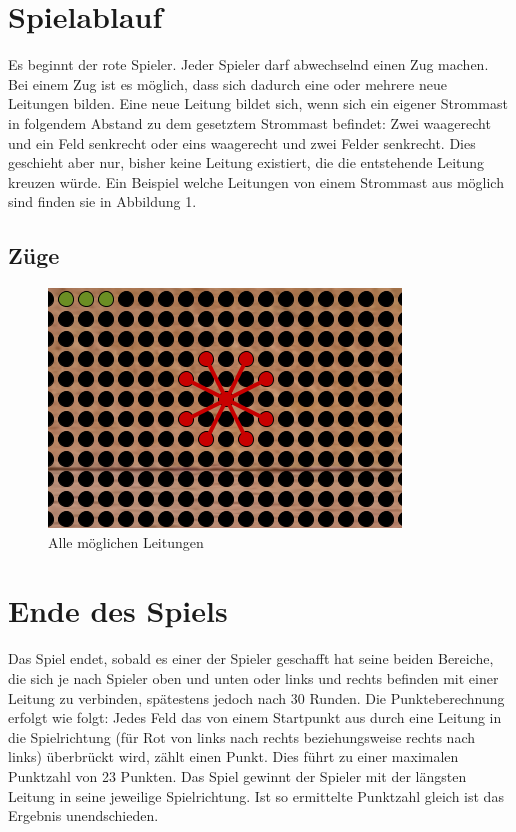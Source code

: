 \documentclass[a4paper, ngerman]{scrartcl}
\begin{document}
\section{Spielablauf}	 

	Es beginnt der rote Spieler. Jeder Spieler darf abwechselnd einen
	Zug machen. Bei einem Zug ist es möglich, dass sich dadurch eine oder mehrere
	neue Leitungen bilden. Eine neue Leitung bildet sich, wenn sich ein eigener
	Strommast in folgendem Abstand zu dem gesetztem Strommast befindet: Zwei
	waagerecht und ein Feld senkrecht oder eins waagerecht und zwei Felder
	senkrecht. Dies geschieht aber nur, bisher keine Leitung existiert, die die
	entstehende Leitung kreuzen würde.
	Ein Beispiel welche Leitungen von einem Strommast aus möglich sind finden sie
	in Abbildung 1.
	 
	
	
	\subsection{Züge}
	
	\begin{figure}[h!]
		\centering
		\includegraphics[scale = 0.8]{bilder/setzzug.png}
		\caption{Alle möglichen Leitungen}
		\label{fig:Leitungen}
	\end{figure}
	
\section{Ende des Spiels} 
	Das Spiel endet, sobald es einer der Spieler geschafft hat seine beiden
	Bereiche, die sich je nach Spieler oben und unten oder links und rechts
	befinden mit einer Leitung zu verbinden, spätestens jedoch nach 30 Runden.
	Die Punkteberechnung erfolgt wie folgt: Jedes Feld das von einem Startpunkt aus
	durch eine Leitung in die Spielrichtung (für Rot von links nach rechts
	beziehungsweise rechts nach links) überbrückt wird, zählt einen Punkt. Dies
	führt zu einer maximalen Punktzahl von 23 Punkten. Das Spiel gewinnt der
	Spieler mit der längsten Leitung in seine jeweilige Spielrichtung.
	Ist so ermittelte Punktzahl gleich ist das Ergebnis unendschieden.
	
\end{document}
